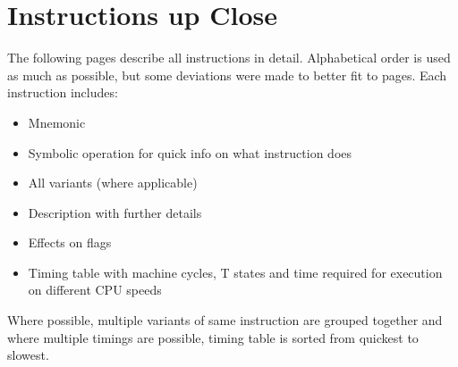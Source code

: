 \chapter{Instructions up Close}
\label{instruction_details}




The following pages describe all instructions in detail. Alphabetical order is used as much as possible, but some deviations were made to better fit to pages. Each instruction includes:

\begin{itemize}
	\setlength\itemsep{1pt}
	\item Mnemonic
	\item Symbolic operation for quick info on what instruction does
	\item All variants (where applicable)
	\item Description with further details
	\item Effects on flags
	\item Timing table with machine cycles, T states and time required for execution on different CPU speeds
\end{itemize}

Where possible, multiple variants of same instruction are grouped together and where multiple timings are possible, timing table is sorted from quickest to slowest.

\pagebreak
\thispagestyle{plain} %


